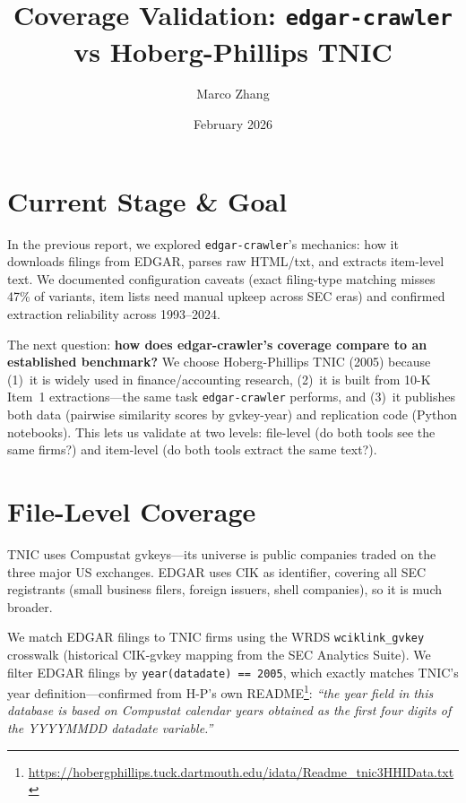\documentclass[11pt]{article}
\title{Coverage Validation: \texttt{edgar-crawler} vs Hoberg-Phillips TNIC}
\author{Marco Zhang}
\date{February 2026}
\begin{document}
\maketitle

\section{Current Stage \& Goal}

In the previous report, we explored \texttt{edgar-crawler}'s mechanics: how it
downloads filings from EDGAR, parses raw HTML/txt, and extracts item-level text.
We documented configuration caveats (exact filing-type matching misses 47\% of
variants, item lists need manual upkeep across SEC eras) and confirmed extraction
reliability across 1993--2024.

The next question: \textbf{how does edgar-crawler's coverage compare to an
established benchmark?} We choose Hoberg-Phillips TNIC (2005) because (1)~it is
widely used in finance/accounting research, (2)~it is built from 10-K Item~1
extractions---the same task \texttt{edgar-crawler} performs, and (3)~it publishes
both data (pairwise similarity scores by gvkey-year) and replication code (Python
notebooks). This lets us validate at two levels: file-level (do both tools see
the same firms?) and item-level (do both tools extract the same text?).

\section{File-Level Coverage}

TNIC uses Compustat gvkeys---its universe is public companies traded on the
three major US exchanges. EDGAR uses CIK as identifier, covering all SEC
registrants (small business filers, foreign issuers, shell companies), so it is
much broader.

We match EDGAR filings to TNIC firms using the WRDS \texttt{wciklink\_gvkey}
crosswalk (historical CIK-gvkey mapping from the SEC Analytics Suite). We filter
EDGAR filings by \texttt{year(datadate) == 2005}, which exactly matches TNIC's
year definition---confirmed from H-P's own
README\footnote{\url{https://hobergphillips.tuck.dartmouth.edu/idata/Readme_tnic3HHIData.txt}}:
\emph{``the year field in this database is based on Compustat calendar years
obtained as the first four digits of the YYYYMMDD datadate variable.''}
\end{document}
